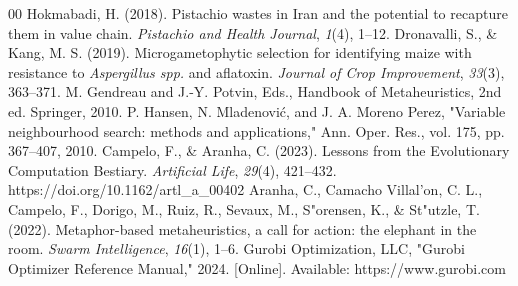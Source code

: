 \documentclass[conference]{IEEEtran}
\begin{document}
\begin{thebibliography}{00}
     Hokmabadi, H. (2018). Pistachio wastes in Iran and the potential to recapture them in value chain. \textit{Pistachio and Health Journal}, \textit{1}(4), 1--12.
     Dronavalli, S., \& Kang, M. S. (2019). Microgametophytic selection for identifying maize with resistance to \textit{Aspergillus spp.} and aflatoxin. \textit{Journal of Crop Improvement}, \textit{33}(3), 363--371.
     M. Gendreau and J.-Y. Potvin, Eds., Handbook of Metaheuristics, 2nd ed. Springer, 2010.    
     P. Hansen, N. Mladenović, and J. A. Moreno Perez, "Variable neighbourhood search: methods and applications," Ann. Oper. Res., vol. 175, pp. 367--407, 2010.
     Campelo, F., \& Aranha, C. (2023). Lessons from the Evolutionary Computation Bestiary. \textit{Artificial Life}, \textit{29}(4), 421--432. https://doi.org/10.1162/artl\_a\_00402
     Aranha, C., Camacho Villal{'o}n, C. L., Campelo, F., Dorigo, M., Ruiz, R., Sevaux, M., S{"o}rensen, K., \& St{"u}tzle, T. (2022). Metaphor-based metaheuristics, a call for action: the elephant in the room. \textit{Swarm Intelligence}, \textit{16}(1), 1--6.
     Gurobi Optimization, LLC, "Gurobi Optimizer Reference Manual," 2024. [Online]. Available: https://www.gurobi.com
\end{thebibliography}

\vspace{12pt}
\end{document}
